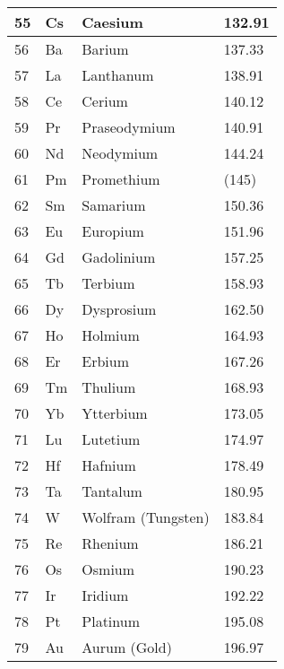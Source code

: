 \documentclass{article}
\begin{document}
\begin{center}
\begin{longtable}{|l|l|l|l|}
    55 & Cs & \cellcolor{alkalibeige}Caesium & 132.91\\
 \hline
    56 & Ba & \cellcolor{alkalineyellow}Barium & 137.33\\
 \hline
    57 & La & \cellcolor{lanthorange}Lanthanum & 138.91\\
 \hline
    58 & Ce & \cellcolor{lanthorange}Cerium & 140.12\\
 \hline
    59 & Pr & \cellcolor{lanthorange}Praseodymium & 140.91\\
 \hline
    60 & Nd & \cellcolor{lanthorange}Neodymium & 144.24\\
 \hline
    61 & Pm & \cellcolor{lanthorange}Promethium & (145)\\
 \hline
    62 & Sm & \cellcolor{lanthorange}Samarium & 150.36\\
 \hline
    63 & Eu & \cellcolor{lanthorange}Europium & 151.96\\
 \hline
    64 & Gd & \cellcolor{lanthorange}Gadolinium & 157.25\\
 \hline
    65 & Tb & \cellcolor{lanthorange}Terbium & 158.93\\
 \hline
    66 & Dy & \cellcolor{lanthorange}Dysprosium & 162.50\\
 \hline
    67 & Ho & \cellcolor{lanthorange}Holmium & 164.93\\
 \hline
    68 & Er & \cellcolor{lanthorange}Erbium & 167.26\\
 \hline
    69 & Tm & \cellcolor{lanthorange}Thulium & 168.93\\
 \hline
    70 & Yb & \cellcolor{lanthorange}Ytterbium & 173.05\\
 \hline
    71 & Lu & \cellcolor{lanthorange}Lutetium & 174.97\\
 \hline
    72 & Hf & \cellcolor{transred}Hafnium & 178.49\\
 \hline
    73 & Ta & \cellcolor{transred}Tantalum & 180.95\\
 \hline
    74 & W & \cellcolor{transred}Wolfram (Tungsten) & 183.84\\
 \hline
    75 & Re & \cellcolor{transred}Rhenium & 186.21\\
 \hline
    76 & Os & \cellcolor{transred}Osmium & 190.23\\
 \hline
    77 & Ir & \cellcolor{transred}Iridium & 192.22\\
 \hline
    78 & Pt & \cellcolor{transred}Platinum & 195.08\\
 \hline
    79 & Au & \cellcolor{transred}Aurum (Gold) & 196.97\\

\end{longtable}
\end{center}
\end{document}
